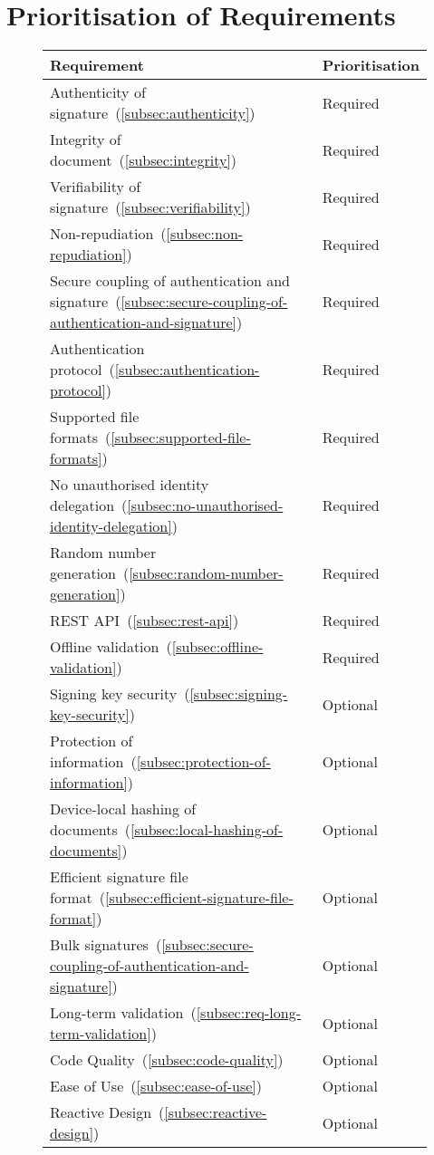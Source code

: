 \section{Prioritisation of Requirements}\label{sec:prioritisation}
\begin{figure}[H]
    \begin{center}
        \begin{tabular}{p{12cm}|p{2.5cm}}
            \textbf{Requirement} & \textbf{Prioritisation}\\
            \hline
            Authenticity of signature~(\ref{subsec:authenticity}) & Required\\
            Integrity of document~(\ref{subsec:integrity}) & Required\\
            Verifiability of signature~(\ref{subsec:verifiability}) & Required\\
            Non-repudiation~(\ref{subsec:non-repudiation}) & Required\\
            Secure coupling of authentication and signature~(\ref{subsec:secure-coupling-of-authentication-and-signature}) & Required\\
            Authentication protocol~(\ref{subsec:authentication-protocol}) & Required\\
            Supported file formats~(\ref{subsec:supported-file-formats}) & Required\\
            No unauthorised identity delegation~(\ref{subsec:no-unauthorised-identity-delegation}) & Required\\
            Random number generation~(\ref{subsec:random-number-generation}) & Required\\
            \gls{REST} \gls{API}~(\ref{subsec:rest-api}) & Required\\
            Offline validation~(\ref{subsec:offline-validation}) & Required\\
            Signing key security~(\ref{subsec:signing-key-security}) & Optional\\
            Protection of information~(\ref{subsec:protection-of-information}) & Optional\\
            Device-local hashing of documents~(\ref{subsec:local-hashing-of-documents}) & Optional\\
            Efficient signature file format~(\ref{subsec:efficient-signature-file-format}) & Optional\\
            Bulk signatures~(\ref{subsec:secure-coupling-of-authentication-and-signature}) & Optional\\
            Long-term validation~(\ref{subsec:req-long-term-validation}) & Optional\\
            Code Quality~(\ref{subsec:code-quality}) & Optional\\
            Ease of Use~(\ref{subsec:ease-of-use}) & Optional\\
            Reactive Design~(\ref{subsec:reactive-design}) & Optional\\
        \end{tabular}
    \end{center}
\end{figure}
